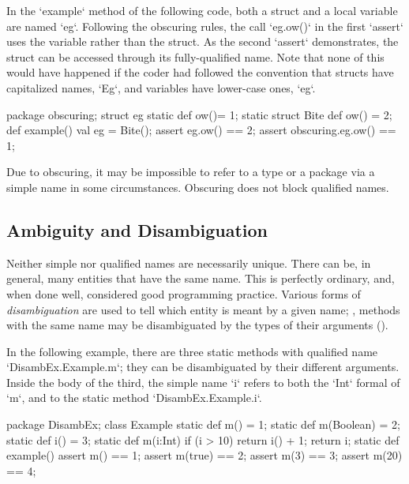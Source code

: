 \begin{ex}
In the \xcd`example` method of the following code, both a struct and a local
variable are named \xcd`eg`.  Following the obscuring rules, the call
\xcd`eg.ow()` in the first \xcd`assert` uses the variable rather than the struct.  
As the second \xcd`assert` demonstrates, the struct can be accessed through
its fully-qualified name.   Note that none of this would have happened if the
coder had followed the convention that structs have capitalized names,
\xcd`Eg`, and variables have lower-case ones, \xcd`eg`. 

% 
\begin{xten}
package obscuring;
struct eg {
   static def ow()= 1;
   static struct Bite {
      def ow() = 2;
   }
   def example() {
       val eg = Bite();
       assert eg.ow() == 2;
       assert obscuring.eg.ow() == 1;
     }
}

\end{xten}

\end{ex}

Due to obscuring, it may be impossible to refer to a type or a package via a
simple name in some circumstances.  Obscuring does not block qualified names.



\subsection{Ambiguity and Disambiguation}

Neither simple nor qualified names are necessarily unique.  There can be, in
general, many entities that have the same name.  This is perfectly ordinary,
and, when done well, considered good programming practice.   Various forms of
{\em disambiguation} are used to tell which entity is meant by a given name;
\eg, methods with the same name may be disambiguated by the types of their
arguments ().

\begin{ex}
In the following example, there are three static methods with 
qualified name \xcd`DisambEx.Example.m`; they can be disambiguated by their
different arguments.   Inside the body of the third, the simple name \xcd`i`
refers to both the \xcd`Int` formal of \xcd`m`, and to the static method 
\xcd`DisambEx.Example.i`.  
\begin{xten}
package DisambEx; 
class Example {
  static def m() = 1;
  static def m(Boolean) = 2;
  static def i() = 3;
  static def m(i:Int) {
    if (i > 10) {
      return i() + 1;
    }
    return i;
  }
  static def example() {
    assert m() == 1;
    assert m(true) == 2;
    assert m(3) == 3;
    assert m(20) == 4;
  }
}
\end{xten}
\end{ex}



